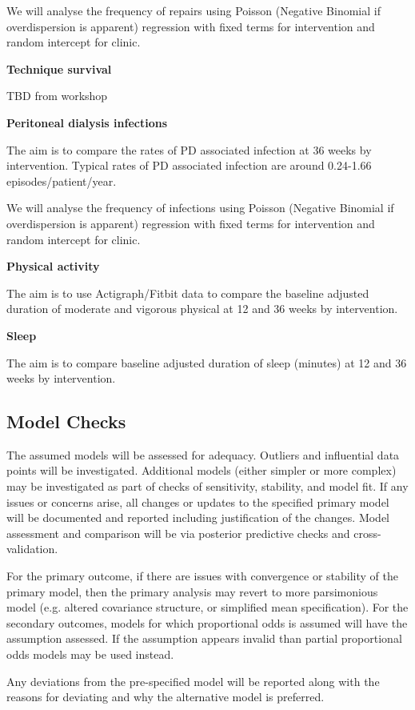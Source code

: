 \documentclass[11pt,parskip=half-]{scrartcl}
\begin{document}
We will analyse the frequency of repairs using Poisson (Negative Binomial if overdispersion is apparent) regression with fixed terms for intervention and random intercept for clinic.

\textbf{Technique survival}

TBD from workshop

\textbf{Peritoneal dialysis infections}

The aim is to compare the rates of PD associated infection at 36 weeks by intervention. Typical rates of PD associated infection are around 0.24-1.66 episodes/patient/year.

We will analyse the frequency of infections using Poisson (Negative Binomial if overdispersion is apparent) regression with fixed terms for intervention and random intercept for clinic.

\textbf{Physical activity}

The aim is to use Actigraph/Fitbit data to compare the baseline adjusted duration of moderate and vigorous physical at 12 and 36 weeks by intervention.

\textbf{Sleep}

The aim is to compare baseline adjusted duration of sleep (minutes) at 12 and 36 weeks by intervention.

\subsection{Model Checks}\label{model-checks}

The assumed models will be assessed for adequacy. Outliers and influential data points will be investigated. Additional models (either simpler or more complex) may be investigated as part of checks of sensitivity, stability, and model fit. If any issues or concerns arise, all changes or updates to the specified primary model will be documented and reported including justification of the changes. Model assessment and comparison will be via posterior predictive checks and cross-validation.

For the primary outcome, if there are issues with convergence or stability of the primary model, then the primary analysis may revert to more parsimonious model (e.g. altered covariance structure, or simplified mean specification). For the secondary outcomes, models for which proportional odds is assumed will have the assumption assessed. If the assumption appears invalid than partial proportional odds models may be used instead.

Any deviations from the pre-specified model will be reported along with the reasons for deviating and why the alternative model is preferred.
\end{document}
